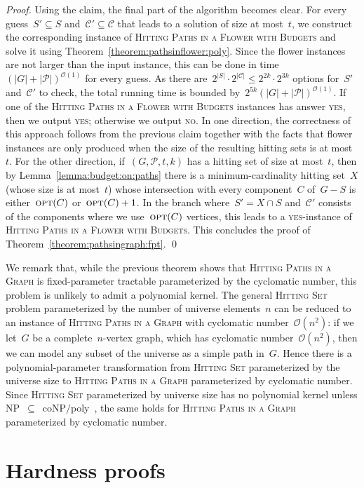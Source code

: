 \let\accentvec\vec  \documentclass{llncs}
\newcommand{\yes}{\textsc{yes}\xspace}
\newcommand{\no}{\textsc{no}\xspace}
\newcommand{\Oh}{{\mathcal{O}}}
\newcommand{\C}{{\mathcal{C}}}
\renewcommand{\P}{\ensuremath{\mathcal{P}}\xspace}
\newcommand{\opt}{\ensuremath{\mathrm{\textsc{opt}}}\xspace}
\newcommand{\containment}[0]{{\sf NP}~$\subseteq$~{\sf coNP$/$poly}\xspace}
\renewcommand{\C}{\ensuremath{\mathcal{C}}\xspace}
\newcommand{\HitPathsInFlower}{\textsc{Hitting Paths in a Flower with Budgets}\xspace}
\newcommand{\HitPathsInGraph}{\textsc{Hitting Paths in a Graph}\xspace}
\newcommand{\HittingSet}{\textsc{Hitting Set}\xspace}
\begin{document}
\begin{proof}
Using the claim, the final part of the algorithm becomes clear. For every guess~$S' \subseteq S$ and~$\C' \subseteq \C$ that leads to a solution of size at most~$t$, we construct the corresponding instance of \HitPathsInFlower and solve it using Theorem~\ref{theorem:pathsinflower:poly}. Since the flower instances are not larger than the input instance, this can be done in time~$(|G| + |\P|)^{\Oh(1)}$ for every guess. As there are~$2^{|S|} \cdot 2^{|\C|} \leq 2^{2k} \cdot 2^{3k}$ options for~$S'$ and~$\C'$ to check, the total running time is bounded by~$2^{5k} (|G| + |\P|)^{\Oh(1)}$. If one of the \HitPathsInFlower instances has answer \yes, then we output \yes; otherwise we output \no. In one direction, the correctness of this approach follows from the previous claim together with the facts that flower instances are only produced when the size of the resulting hitting sets is at most~$t$. For the other direction, if~$(G,\P,t,k)$ has a hitting set of size at most~$t$, then by Lemma~\ref{lemma:budget:on:paths} there is a minimum-cardinality hitting set~$X$ (whose size is at most~$t$) whose intersection with every component~$C$ of~$G - S$ is either~$\opt(C)$ or~$\opt(C) + 1$. In the branch where~$S' = X \cap S$ and~$\C'$ consists of the components where we use~$\opt(C)$ vertices, this leads to a \yes-instance of \HitPathsInFlower. This concludes the proof of Theorem~\ref{theorem:pathsingraph:fpt}.
\qed
\end{proof}

We remark that, while the previous theorem shows that \HitPathsInGraph is fixed-parameter tractable parameterized by the cyclomatic number, this problem is unlikely to admit a polynomial kernel. The general \HittingSet problem parameterized by the number of universe elements~$n$ can be reduced to an instance of \HitPathsInGraph with cyclomatic number~$\Oh(n^2)$: if we let~$G$ be a complete~$n$-vertex graph, which has cyclomatic number~$\Oh(n^2)$, then we can model any subset of the universe as a simple path in~$G$. Hence there is a polynomial-parameter transformation from \HittingSet parameterized by the universe size to \HitPathsInGraph parameterized by cyclomatic number. Since \HittingSet parameterized by universe size has no polynomial kernel unless \containment~\cite[Theorem 5.3]{DomLS14}, the same holds for \HitPathsInGraph parameterized by cyclomatic number.

\section{Hardness proofs} \label{section:hardness}
\end{document}
